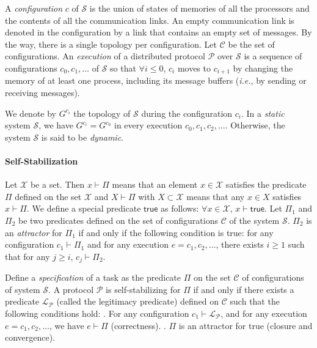 \documentclass[11pt,english]{article}
\newcommand{\Latin}[1]{\textit{#1}}
\newcommand{\ie}{\Latin{i.e.},\xspace}
\begin{document}
A \emph{configuration} $c$ of $\mathcal{S}$ is the union of states of memories
of all the processors and the contents of all the communication links. An empty
communication link is denoted in the configuration by a link that contains an
empty set of messages. By the way, there is a single topology per configuration.
Let $\mathcal{C}$ be the set of configurations.
An \emph{execution} of a distributed protocol $\mathcal{P}$ over $\mathcal{S}$
is a sequence of configurations $c_0, c_1, \ldots$ of $\mathcal{S}$ so that
$\forall i \leq 0$, $c_i$ moves to $c_{i+1}$ by changing the memory of at least one process, including its message
buffers (\ie by sending or receiving messages).  

We denote by $G^{c_i}$ the topology of $\mathcal{S}$ during the configuration
$c_i$.
In a \emph{static} system $\mathcal{S}$, we have $G^{c_i}=G^{c_0}$ in every
execution $c_0,c_1,c_2,\ldots$.  Otherwise, the system $\mathcal{S}$ is said to
be \emph{dynamic}.

\paragraph{Self-Stabilization}
Let $\mathcal{X}$ be a set. Then $x\vdash \Pi$ means that an element $x\in
\mathcal{X}$ satisfies the predicate $\Pi$ defined on the set $\mathcal{X}$ and
$X \vdash \Pi$ with $X \subset \mathcal{X}$ means that any $x \in X$ satisfies
$x\vdash \Pi$.
We define a special predicate $\mathsf{true}$ as follows:
$\forall x\in \mathcal{X}$, $x\vdash \mathsf{true}$.
Let $\Pi_1$ and $\Pi_2$ be two predicates defined on the set of configurations
$\mathcal{C}$ of the system $\mathcal{S}$.  $\Pi_2$ is an {\em attractor} for
$\Pi_1$ if and only if the following condition is true: for any configuration
$c_1 \vdash \Pi_1$ and for any execution $e = c_1,c_2, \ldots $, there exists $i
\geq 1$ such that for any $j \geq i$, $c_j \vdash \Pi_2$.

Define a \emph{specification} of a task as the predicate $\Pi$ on the set
$\mathcal{C}$ of configurations of system $\mathcal{S}$.
A protocol $\mathcal{P}$ is self-stabilizing
for $\Pi$ if and only if
there exists a predicate $\mathcal{L_P}$ (called the legitimacy predicate)
defined on $\mathcal{C}$ such that the following conditions hold:\newline
{}. For any configuration $c_1 \vdash \mathcal{L_P}$, and for any execution $e =
c_1,c_2, \ldots$, we have $e \vdash \Pi$ (correctness).
\newline
{}. $\Pi$ is an attractor for \textsf{true} (closure and convergence).
\end{document}

